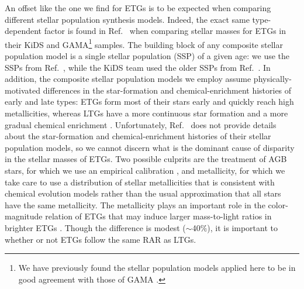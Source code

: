 \documentclass[a4paper,11pt]{article}
\begin{document}
An offset like the one we find for ETGs is to be expected when comparing different stellar population synthesis models. Indeed, the exact same type-dependent factor is found in Ref.~\cite{Brouwer2021} when comparing stellar masses for ETGs in their KiDS and GAMA\footnote{We have previously found the stellar population models applied here to be in good agreement with those of GAMA \citep{Pengfei2019}.} samples.
The building block of any composite stellar population model is a single stellar population (SSP) of a given age: we use the SSPs from Ref.~\cite{CG2010}, while the KiDS team used the older SSPs from Ref.~\cite{BC2003}. In addition, the composite stellar population models we employ \citep{Schombert2014} assume physically-motivated differences in the star-formation and chemical-enrichment histories of early and late types: ETGs form most of their stars early and quickly reach high metallicities, whereas LTGs have a more continuous star formation and a more gradual chemical enrichment \citep[see also][]{Schombert2019, Schombert2022}. Unfortunately, Ref.~\cite{Brouwer2021} does not provide details about the star-formation and chemical-enrichment histories of their stellar population models, so we cannot discern what is the dominant cause of disparity in the stellar masses of ETGs.
Two possible culprits are the treatment of AGB stars, for which we use an empirical calibration \cite{Schombert2014}, and metallicity, for which we take care to use a distribution of stellar metallicities that is consistent with chemical evolution models rather than the usual approximation that all stars have the same metallicity. The metallicity plays an important role in the color-magnitude relation of ETGs \cite{Kodama1997} that may induce larger mass-to-light ratios in brighter ETGs \cite{Schombert2019}. 
%
Though the difference is modest ($\sim$40$\%$), it is important to whether or not ETGs follow the same RAR as LTGs.


%
%
%
%
%
%
%
%
%
%
%
%
\end{document}
